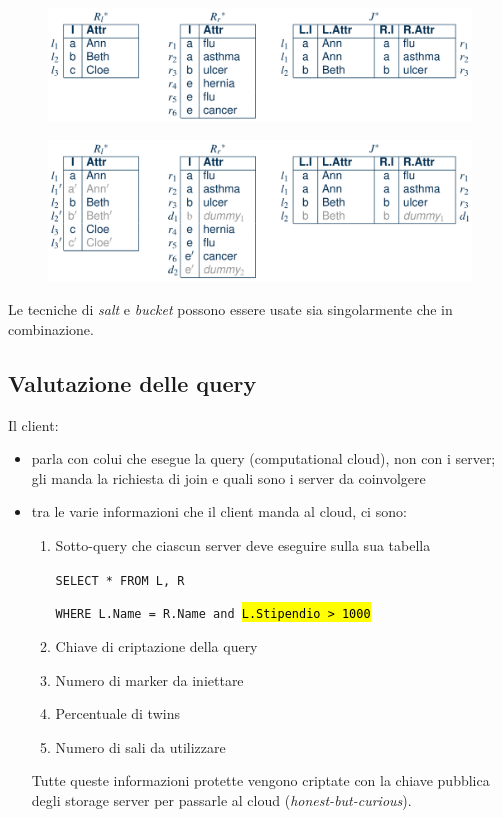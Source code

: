 \documentclass{report}
\begin{document}
\begin{figure}[H]
    \centering
    \includegraphics[width=1\linewidth]{images/salt1.png}
\end{figure}

\begin{figure}[H]
    \centering
    \includegraphics[width=1\linewidth]{images/salt2.png}
\end{figure}

\noindent Le tecniche di \textit{salt} e \textit{bucket} possono essere 
usate sia singolarmente che in combinazione.


\subsection{Valutazione delle query}

Il client:
\begin{itemize}
    \item parla con colui che esegue la query (computational cloud), non con i server; gli manda 
    la richiesta di join e quali sono i server da coinvolgere 
    \item tra le varie informazioni che il client manda al cloud, ci sono:
    \begin{enumerate}
        \item Sotto-query che ciascun server deve eseguire sulla sua tabella
        
        \texttt{SELECT * FROM L, R}
        
        \texttt{WHERE L.Name = R.Name and \hl{L.Stipendio > 1000}}

        \item Chiave di criptazione della query
        \item Numero di marker da iniettare
        \item Percentuale di twins 
        \item Numero di sali da utilizzare
    \end{enumerate}

    \noindent Tutte queste informazioni protette vengono criptate con la chiave pubblica degli storage server per passarle al cloud (\textit{honest-but-curious}).
\end{itemize}
\end{document}
